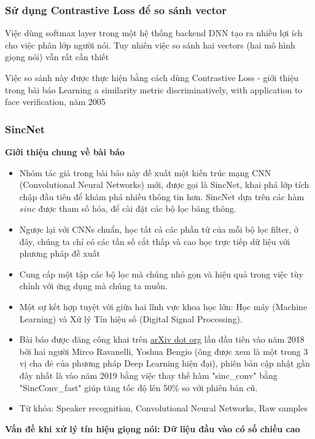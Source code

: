 \documentclass{article}
\begin{document}
	\subsubsection{Sử dụng Contrastive Loss để so sánh vector}
	\qquad Việc dùng softmax layer trong một hệ thống backend DNN tạo ra nhiều lợi ích cho việc phân lớp người nói. Tuy nhiên việc so sánh hai vectors (hai mô hình giọng nói) vẫn rất cần thiết
	
	Việc so sánh này được thực hiện bằng cách dùng Contrastive Loss - giới thiệu trong bài báo Learning a similarity metric discriminatively, with application to face verification, năm 2005 
	
		
	\subsubsection{SincNet}
	\qquad \textbf{Giới thiệu chung về bài báo}
	\begin{itemize}
		\item Nhóm tác giả trong bài báo này đề xuất một kiến trúc mạng CNN (Convolutional Neural Networks) mới, được gọi là SincNet, khai phá lớp tích chập đầu tiên để khám phá nhiều thông tin hơn. SincNet dựa trên các hàm $sinc$ được tham số hóa, để cài đặt các bộ lọc băng thông.
		\item Ngược lại với CNNs chuẩn, học tất cả các phần tử của mỗi bộ lọc filter, ở đây, chúng ta chỉ có các tần số cắt thấp và cao học trực tiếp dữ liệu với phương pháp đề xuất
		\item Cung cấp một tập các bộ lọc mà chúng nhỏ gọn và hiệu quả trong việc tùy chỉnh với ứng dụng mà chúng ta muốn.
		\item Một sự kết hợp tuyệt vời giữa hai lĩnh vực khoa học lớn: Học máy (Machine Learning) và Xử lý Tín hiệu số (Digital Signal Processing).
		\item Bài báo được đăng công khai trên \href{arxiv.org}{arXiv dot org} lần đầu tiên vào năm 2018 bởi hai người Mirco Ravanelli, Yoshua Bengio (ông được xem là một trong 3 vị cha đẻ của phương pháp Deep Learning hiện đại), phiên bản cập nhật gần đây nhất là vào năm 2019 bằng việc thay thế hàm "sinc\_conv" bằng "SincConv\_fast" giúp tăng tốc độ lên 50\% so với phiên bản cũ.
		\item Từ khóa: Speaker recognition, Convolutional Neural Networks, Raw samples
	\end{itemize}
	 
	\textbf{Vấn đề khi xử lý tín hiệu giọng nói: Dữ liệu đầu vào có số chiều cao}
	
\end{document}
